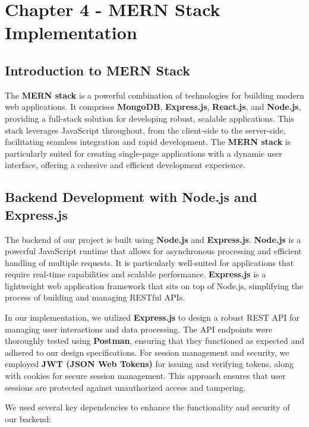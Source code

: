 \section{Chapter 4 - MERN Stack Implementation}
\subsection{Introduction to MERN Stack}

The \textbf{MERN stack} is a powerful combination of technologies for building modern web applications. It comprises \textbf{MongoDB}, \textbf{Express.js}, \textbf{React.js}, and \textbf{Node.js}, providing a full-stack solution for developing robust, scalable applications. This stack leverages JavaScript throughout, from the client-side to the server-side, facilitating seamless integration and rapid development. The \textbf{MERN stack} is particularly suited for creating single-page applications with a dynamic user interface, offering a cohesive and efficient development experience.

\subsection{Backend Development with Node.js and Express.js}

The backend of our project is built using \textbf{Node.js} and \textbf{Express.js}. \textbf{Node.js} is a powerful JavaScript runtime that allows for asynchronous processing and efficient handling of multiple requests. It is particularly well-suited for applications that require real-time capabilities and scalable performance. \textbf{Express.js} is a lightweight web application framework that sits on top of Node.js, simplifying the process of building and managing RESTful APIs.

In our implementation, we utilized \textbf{Express.js} to design a robust REST API for managing user interactions and data processing. The API endpoints were thoroughly tested using \textbf{Postman}, ensuring that they functioned as expected and adhered to our design specifications. For session management and security, we employed \textbf{JWT (JSON Web Tokens)} for issuing and verifying tokens, along with cookies for secure session management. This approach ensures that user sessions are protected against unauthorized access and tampering.

We used several key dependencies to enhance the functionality and security of our backend:

